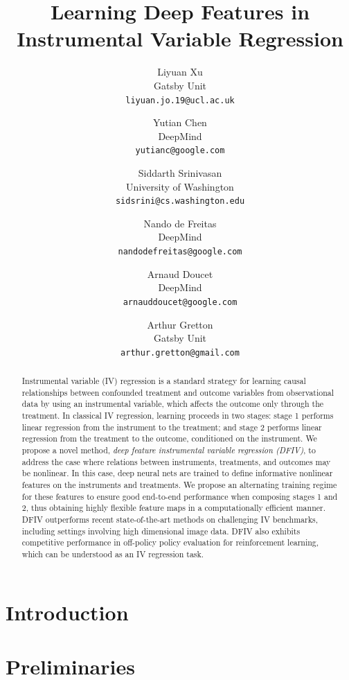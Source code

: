 \documentclass{article}
\title{Learning Deep Features in Instrumental Variable Regression}
\author{
Liyuan Xu \\
Gatsby Unit\\
\texttt{liyuan.jo.19@ucl.ac.uk}
\and
Yutian Chen\\
DeepMind\\
\texttt{yutianc@google.com}
\and
Siddarth Srinivasan\\
University of Washington\\
\texttt{sidsrini@cs.washington.edu}
\and
Nando de Freitas\\
DeepMind\\
\texttt{nandodefreitas@google.com}
\and
Arnaud Doucet\\
DeepMind\\
\texttt{arnauddoucet@google.com}
\and
Arthur Gretton\\
Gatsby Unit\\
\texttt{arthur.gretton@gmail.com}
}
\begin{document}
\maketitle

\begin{abstract}
Instrumental variable (IV) regression is a standard strategy for learning causal relationships between confounded treatment and outcome variables from observational data by using an instrumental variable, which affects the outcome only through the treatment.
In classical IV regression, learning proceeds in two stages: stage 1 performs linear regression from the instrument to the treatment; and stage 2 performs linear regression from the treatment to the outcome, conditioned on the instrument.
We propose a novel method, {\it deep feature instrumental variable regression (DFIV)},
to address the case where relations between instruments, treatments, and outcomes may be nonlinear.
In this case, deep neural nets are trained to define informative nonlinear features on the instruments and treatments.
We propose an alternating training regime for these features to ensure good end-to-end performance when composing stages 1 and 2, thus obtaining highly flexible feature maps in a computationally efficient manner.
DFIV outperforms recent state-of-the-art methods on challenging IV benchmarks, including settings involving high dimensional image data. DFIV also exhibits competitive performance in off-policy policy evaluation for reinforcement learning, which can be understood as an IV regression task.

\end{abstract}

\section{Introduction} \label{sec:intro}


%

\section{Preliminaries} \label{sec:preliminary}
\end{document}
